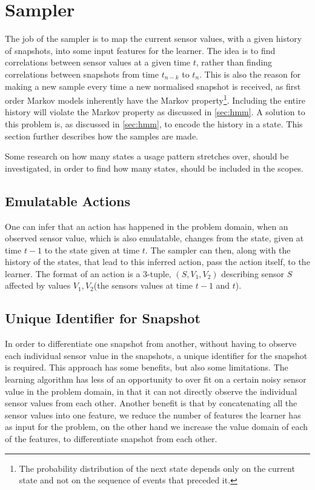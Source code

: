 \section{Sampler}\label{sec:sampler}
The job of the sampler is to map the current sensor values, with a given history of snapshots, into some input features for the learner.
The idea is to find correlations between sensor values at a given time $t$, rather than finding correlations between snapshots from time $t_{n-k}$ to $t_n$. This is also the reason for making a new sample every time a new normalised snapshot is received, as first order Markov models inherently have the Markov property\footnote{The probability distribution of the next state depends only on the current state and not on the sequence of events that preceded it.\cite{wiki_markov_chain}}. Including the entire history will violate the Markov property as discussed in \cref{sec:hmm}. A solution to this problem is, as discussed in \cref{sec:hmm}, to encode the history in a state. This section further describes how the samples are made.

Some research on how many states a usage pattern stretches over, should be investigated, in order to find how many states, should be included in the scopes.

\subsection{Emulatable Actions}
One can infer that an action has happened in the problem domain, when an observed sensor value, which is also emulatable, changes from the state, given at time $t-1$ to the state given at time $t$. The sampler can then, along with the history of the states, that lead to this inferred action, pass the action itself, to the learner. The format of an action is a 3-tuple, $(S,V_1,V_2)$ describing sensor $S$ affected by values $V_1, V_2$(the sensors values at time $t-1$ and $t$).

\subsection{Unique Identifier for Snapshot}

In order to differentiate one snapshot from another, without having to observe each individual sensor value in the snapshots, a unique identifier for the snapshot is required.
This approach has some benefits, but also some limitations. The learning algorithm has less of an opportunity to over fit on a certain noisy sensor value in the problem domain, in that it can not directly observe the individual sensor values from each other.
Another benefit is that by concatenating all the sensor values into one feature, we reduce the number of features the learner has as input for the problem, on the other hand we increase the value domain of each of the features, to differentiate snapshot from each other.

